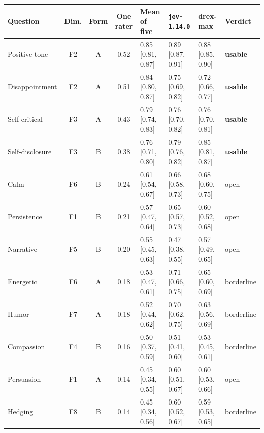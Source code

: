 {\footnotesize
\begin{tabular}{l cc c l l l l}
\toprule
Question & Dim. & Form & One rater & Mean of five & \texttt{jev-1.14.0} & drex-max & Verdict \\
\midrule
Positive tone & F2 & A & 0.52 & 0.85 {\scriptsize[0.81, 0.87]} & 0.89 {\scriptsize[0.87, 0.91]} & 0.88 {\scriptsize[0.85, 0.90]} & \textbf{usable} \\
Disappointment & F2 & A & 0.51 & 0.84 {\scriptsize[0.80, 0.87]} & 0.75 {\scriptsize[0.69, 0.82]} & 0.72 {\scriptsize[0.66, 0.77]} & \textbf{usable} \\
Self-critical & F3 & A & 0.43 & 0.79 {\scriptsize[0.74, 0.83]} & 0.76 {\scriptsize[0.70, 0.82]} & 0.76 {\scriptsize[0.70, 0.81]} & \textbf{usable} \\
Self-disclosure & F3 & B & 0.38 & 0.76 {\scriptsize[0.71, 0.80]} & 0.79 {\scriptsize[0.76, 0.82]} & 0.85 {\scriptsize[0.81, 0.87]} & \textbf{usable} \\
Calm & F6 & B & 0.24 & 0.61 {\scriptsize[0.54, 0.67]} & 0.66 {\scriptsize[0.58, 0.73]} & 0.68 {\scriptsize[0.60, 0.75]} & open \\
Persistence & F1 & B & 0.21 & 0.57 {\scriptsize[0.47, 0.64]} & 0.65 {\scriptsize[0.57, 0.73]} & 0.60 {\scriptsize[0.52, 0.68]} & open \\
Narrative & F5 & B & 0.20 & 0.55 {\scriptsize[0.45, 0.63]} & 0.47 {\scriptsize[0.38, 0.55]} & 0.57 {\scriptsize[0.49, 0.65]} & open \\
Energetic & F6 & A & 0.18 & 0.53 {\scriptsize[0.47, 0.61]} & 0.71 {\scriptsize[0.66, 0.75]} & 0.65 {\scriptsize[0.60, 0.69]} & borderline \\
Humor & F7 & A & 0.18 & 0.52 {\scriptsize[0.44, 0.62]} & 0.70 {\scriptsize[0.62, 0.75]} & 0.63 {\scriptsize[0.56, 0.69]} & borderline \\
Compassion & F4 & B & 0.16 & 0.50 {\scriptsize[0.37, 0.59]} & 0.51 {\scriptsize[0.41, 0.60]} & 0.53 {\scriptsize[0.45, 0.61]} & borderline \\
Persuasion & F1 & A & 0.14 & 0.45 {\scriptsize[0.34, 0.55]} & 0.60 {\scriptsize[0.51, 0.67]} & 0.60 {\scriptsize[0.53, 0.66]} & open \\
Hedging & F8 & B & 0.14 & 0.45 {\scriptsize[0.34, 0.56]} & 0.60 {\scriptsize[0.52, 0.67]} & 0.59 {\scriptsize[0.53, 0.65]} & borderline \\
\bottomrule
\end{tabular}}
